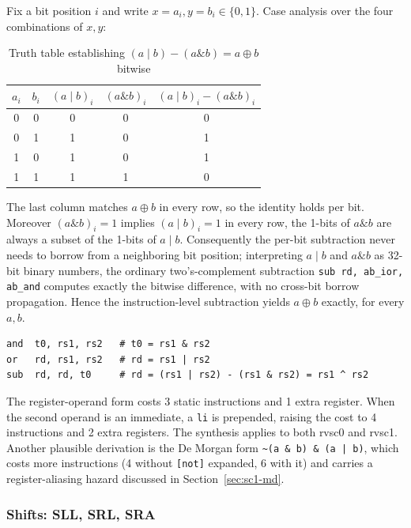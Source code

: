 Fix a bit position $i$ and write $x = a_i, y = b_i \in \{0, 1\}$. Case analysis over the four
combinations of $x, y$:

\begin{table}[htb]
\centering
\caption{Truth table establishing $(a \mid b) - (a \mathbin{\&} b) = a \oplus b$ bitwise}
\label{tab:xor-truth}
\begin{tabular}{ccccc}
\toprule
$a_i$ & $b_i$ & $(a \mid b)_i$ & $(a \mathbin{\&} b)_i$ & $(a \mid b)_i - (a \mathbin{\&} b)_i$ \\
\midrule
0 & 0 & 0 & 0 & 0 \\
0 & 1 & 1 & 0 & 1 \\
1 & 0 & 1 & 0 & 1 \\
1 & 1 & 1 & 1 & 0 \\
\bottomrule
\end{tabular}
\end{table}

The last column matches $a \oplus b$ in every row, so the identity holds per bit. Moreover
$(a \mathbin{\&} b)_i = 1$ implies $(a \mid b)_i = 1$ in every row, the 1-bits of $a \mathbin{\&}
b$ are always a subset of the 1-bits of $a \mid b$. Consequently the per-bit subtraction never needs
to borrow from a neighboring bit position; interpreting $a \mid b$ and $a \mathbin{\&} b$ as 32-bit
binary numbers, the ordinary two's-complement subtraction \texttt{sub rd, ab\_ior, ab\_and} computes
exactly the bitwise difference, with no cross-bit borrow propagation. Hence the instruction-level
subtraction yields $a \oplus b$ exactly, for every $a, b$.

\begin{lstlisting}
and  t0, rs1, rs2   # t0 = rs1 & rs2
or   rd, rs1, rs2   # rd = rs1 | rs2
sub  rd, rd, t0     # rd = (rs1 | rs2) - (rs1 & rs2) = rs1 ^ rs2
\end{lstlisting}

The register-operand form costs 3 static instructions and 1 extra register. When the second operand
is an immediate, a \texttt{li} is prepended, raising the cost to 4 instructions and 2 extra
registers. The synthesis applies to both rvsc0 and rvsc1. Another plausible derivation is the
De Morgan form \texttt{\textasciitilde(a \& b) \& (a | b)}, which costs more instructions (4 without
\texttt{[not]} expanded, 6 with it) and carries a register-aliasing hazard discussed in
Section~\ref{sec:sc1-md}.

\subsubsection{Shifts: SLL, SRL, SRA} \label{sec:sc1-shifts}

